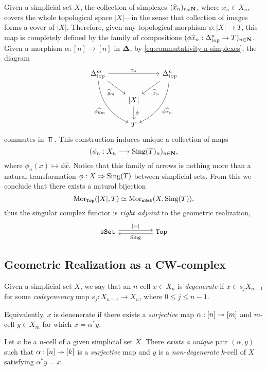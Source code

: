 Given a simplicial set \(X\), the collection of simplexes
\((\widehat{x}_n)_{n \in \mathbf{N}}\), where \(x_n \in X_n\), covers the whole
topological space \(|X|\)---in the sense that collection of images forms a cover
of \(|X|\). Therefore, given any topological morphism \(\phi: |X| \to T\), this
map is completely defined by the family of compositions
\((\phi \widehat{x}_n: \Delta_{\text{top}}^n \to T)_{n \in \mathbf{N}}\). Given a morphism
\(\alpha: [n] \to [n]\) in \({\mathbf{\Delta}}\), by \cref{eq:commutativity-n-simplexes},
the diagram
\[
\begin{tikzcd}
\splxtop^m \ar[rr, "\alpha_{*}"]
\ar[rd, "\widehat y_m"']
\ar[drd, bend right, "\phi \widehat y_m"']
& &\splxtop^n \ar[ld, "\widehat x_n"]
\ar[dld, bend left, "\phi \widehat x_n"] \\
&{|X|} \ar[d, "\phi"] & \\
&T &
\end{tikzcd}
\]
commutes in \(\Top\). This construction induces unique a collection of maps
\[
(\phi_n: X_n \longrightarrow \operatorname{Sing}(T)_n)_{n \in \mathbf{N}},
\]
where \(\phi_n(x) \mapsto \phi \widehat x\). Notice that this family of arrows
is nothing more than a natural transformation \(\phi: X \Rightarrow \operatorname{Sing}(T)\) between
simplicial sets. From this we conclude that there exists a natural bijection
\[
\operatorname{Mor}_{{\texttt{Top}}}(|X|, T) \simeq \operatorname{Mor}_{{\texttt{sSet}}}(X, \operatorname{Sing}(T)),
\]
thus the singular complex functor is \emph{right adjoint} to the geometric
realization,
\[
\begin{tikzcd}
\sSet \ar[rr, shift left, "{|-|}"] &&\Top \ar[ll, shift left, "\Sing"]
\end{tikzcd}
\]

\subsection{Geometric Realization as a CW-complex}

\begin{definition}
\label{def:degenerate-n-cell}
Given a simplicial set \(X\), we say that an \(n\)-cell \(x \in X_n\) is
\emph{degenerate} if \(x \in s_j X_{n-1}\) for some \emph{codegeneracy} map
\(s_j: X_{n-1} \to X_n\), where \(0 \leq j \leq n-1\).

Equivalently, \(x\) is denenerate if there exists a \emph{surjective} map
\(\alpha: [n] \twoheadrightarrow [m]\) and \(m\)-cell \(y \in X_m\) for which
\(x = \alpha^{*} y\).
\end{definition}

\begin{lemma}
\label{lem:Eilenberg-Zilber}
Let \(x\) be a \(n\)-cell of a given simplicial set \(X\). There \emph{exists
  a unique} pair \((\alpha, y)\) such that \(\alpha: [n] \twoheadrightarrow [k]\) is a
\emph{surjective} map and \(y\) is a \emph{non-degenerate} \(k\)-cell of
\(X\) satisfying \(\alpha^{*} y = x\).
\end{lemma}

